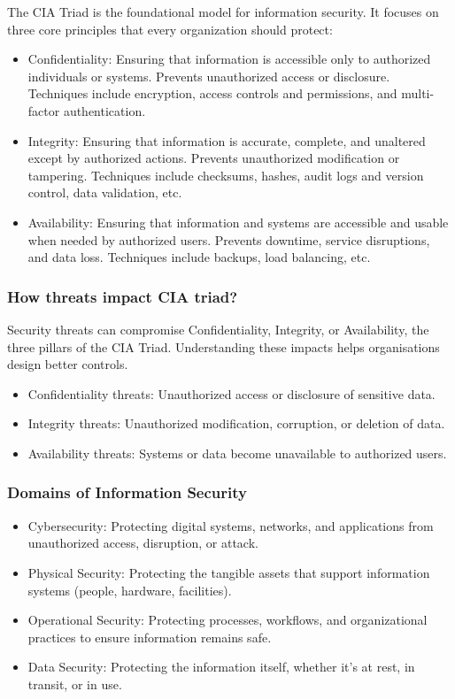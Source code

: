 \indent 

The CIA Triad is the foundational model for information security. It focuses on three core principles that every organization should protect:

\begin{itemize}
    \item Confidentiality: Ensuring that information is accessible only to authorized individuals or systems. Prevents unauthorized access or disclosure. Techniques include encryption, access controls and permissions, and multi-factor authentication.
    \item Integrity: Ensuring that information is accurate, complete, and unaltered except by authorized actions. Prevents unauthorized modification or tampering. Techniques include checksums, hashes, audit logs and version control, data validation, etc.
    \item Availability: Ensuring that information and systems are accessible and usable when needed by authorized users. Prevents downtime, service disruptions, and data loss. Techniques include backups, load balancing, etc.
\end{itemize}

\subsubsection{How threats impact CIA triad?}

\indent 

Security threats can compromise Confidentiality, Integrity, or Availability, the three pillars of the CIA Triad. Understanding these impacts helps organisations design better controls.

\begin{itemize}
    \item Confidentiality threats: Unauthorized access or disclosure of sensitive data.
    \item Integrity threats: Unauthorized modification, corruption, or deletion of data.
    \item Availability threats: Systems or data become unavailable to authorized users.
\end{itemize}

\subsubsection{Domains of Information Security}

\begin{itemize}
    \item Cybersecurity: Protecting digital systems, networks, and applications from unauthorized access, disruption, or attack.
    \item Physical Security: Protecting the tangible assets that support information systems (people, hardware, facilities).
    \item Operational Security: Protecting processes, workflows, and organizational practices to ensure information remains safe.
    \item Data Security: Protecting the information itself, whether it’s at rest, in transit, or in use.
\end{itemize}

